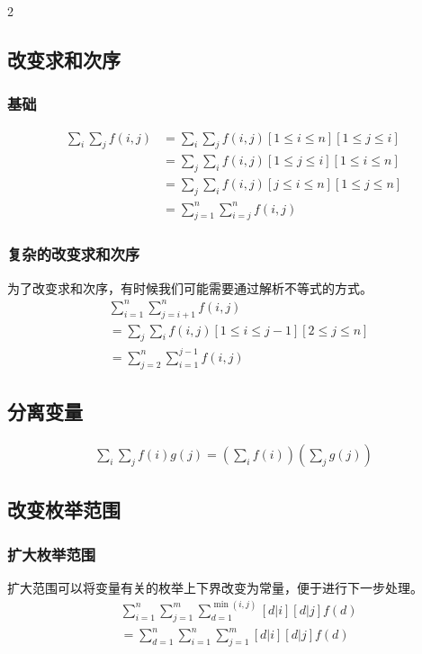 \documentclass[8pt,a4paper]{article}
\begin{document}
\begin{multicols}{2}
    \subsection{改变求和次序}
    \subsubsection{基础}
    \begin{align*}
        \sum_i \sum_j f(i,j) 
        &= \sum_i \sum_j f(i,j) [1 \le i \le n] [1 \le j \le i] \\
        &= \sum_j \sum_i f(i,j) [1 \le j \le i] [1 \le i \le n] \\
        &= \sum_j \sum_i f(i,j) [j \le i \le n] [1 \le j \le n] \\
        &= \sum_{j=1}^{n} \sum_{i=j}^{n} f(i,j)
    \end{align*}
    \subsubsection{复杂的改变求和次序}
    为了改变求和次序，有时候我们可能需要通过解析不等式的方式。
    \begin{align*}
        &\sum_{i=1}^{n} \sum_{j=i+1}^{n} f(i,j) \\
        &= \sum_j \sum_i f(i,j) [1 \le i \le j-1] [2 \le j \le n] \\
        &= \sum_{j=2}^{n} \sum_{i=1}^{j-1} f(i,j)
    \end{align*}

    \subsection{分离变量}
    \begin{align*}
        \sum_i \sum_j f(i)g(j) = \left( \sum_i f(i) \right) \left( \sum_j g(j) \right)
    \end{align*}

    \subsection{改变枚举范围}
    \subsubsection{扩大枚举范围}
    扩大范围可以将变量有关的枚举上下界改变为常量，便于进行下一步处理。
    \begin{align*}
        &\sum_{i=1}^{n} \sum_{j=1}^{m} \sum_{d=1}^{\min(i,j)} [d|i][d|j]f(d) \\
        &= \sum_{d=1}^{n} \sum_{i=1}^{n} \sum_{j=1}^{m} [d|i][d|j]f(d)
    \end{align*}


\end{multicols}
\end{document}
